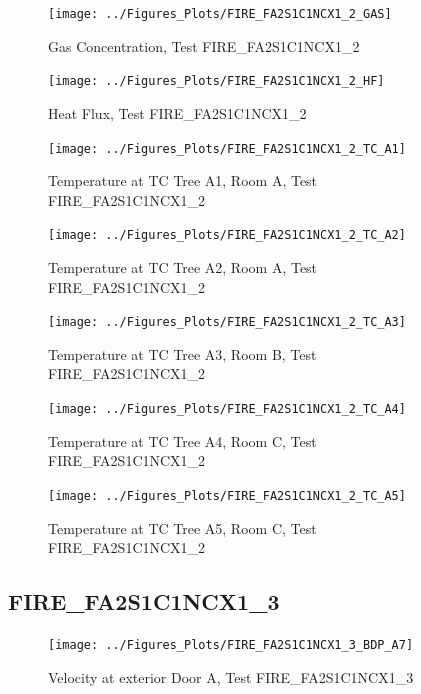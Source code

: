 \documentclass[11pt,oneside]{book}
\begin{document}
\begin{figure}[!ht]
\texttt{[image: ../Figures\_Plots/FIRE\_FA2S1C1NCX1\_2\_GAS]}
\caption{Gas Concentration, Test FIRE\_FA2S1C1NCX1\_2}
\label{fig:FIRE_FA2S1C1NCX1_2_GAS}
\end{figure}

\begin{figure}[!ht]
\texttt{[image: ../Figures\_Plots/FIRE\_FA2S1C1NCX1\_2\_HF]}
\caption{Heat Flux, Test FIRE\_FA2S1C1NCX1\_2}
\label{fig:FIRE_FA2S1C1NCX1_2_HF}
\end{figure}

\begin{figure}[!ht]
\texttt{[image: ../Figures\_Plots/FIRE\_FA2S1C1NCX1\_2\_TC\_A1]}
\caption{Temperature at TC Tree A1, Room A, Test FIRE\_FA2S1C1NCX1\_2}
\label{fig:FIRE_FA2S1C1NCX1_2_TC_A1}
\end{figure}

\begin{figure}[!ht]
\texttt{[image: ../Figures\_Plots/FIRE\_FA2S1C1NCX1\_2\_TC\_A2]}
\caption{Temperature at TC Tree A2, Room A, Test FIRE\_FA2S1C1NCX1\_2}
\label{fig:FIRE_FA2S1C1NCX1_2_TC_A2}
\end{figure}

\begin{figure}[!ht]
\texttt{[image: ../Figures\_Plots/FIRE\_FA2S1C1NCX1\_2\_TC\_A3]}
\caption{Temperature at TC Tree A3, Room B, Test FIRE\_FA2S1C1NCX1\_2}
\label{fig:FIRE_FA2S1C1NCX1_2_TC_A3}
\end{figure}

\begin{figure}[!ht]
\texttt{[image: ../Figures\_Plots/FIRE\_FA2S1C1NCX1\_2\_TC\_A4]}
\caption{Temperature at TC Tree A4, Room C, Test FIRE\_FA2S1C1NCX1\_2}
\label{fig:FIRE_FA2S1C1NCX1_2_TC_A4}
\end{figure}

\begin{figure}[!ht]
\texttt{[image: ../Figures\_Plots/FIRE\_FA2S1C1NCX1\_2\_TC\_A5]}
\caption{Temperature at TC Tree A5, Room C, Test FIRE\_FA2S1C1NCX1\_2}
\label{fig:FIRE_FA2S1C1NCX1_2_TC_A5}
\end{figure}


\clearpage


\subsection{FIRE\_FA2S1C1NCX1\_3}

\begin{figure}[!ht]
\texttt{[image: ../Figures\_Plots/FIRE\_FA2S1C1NCX1\_3\_BDP\_A7]}
\caption{Velocity at exterior Door A, Test FIRE\_FA2S1C1NCX1\_3}
\label{fig:FIRE_FA2S1C1NCX1_3_BDP_A7}
\end{figure}
\end{document}
